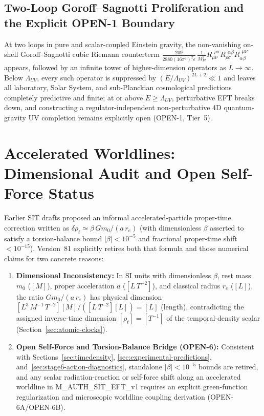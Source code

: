 \documentclass[american,11pt,letterpaper]{article}
\def\mathrm#1{#1}%
\def\texttt#1{#1}%
\def\emph#1{#1}%
\begin{document}
\subsection{Two-Loop Goroff--Sagnotti Proliferation and the Explicit \texttt{OPEN-1} Boundary}

At two loops in pure and scalar-coupled Einstein gravity, the non-vanishing on-shell Goroff--Sagnotti cubic Riemann counterterm $\frac{209}{2880(16\pi^2)^2\epsilon}\,\frac{1}{M_{\mathrm{Pl}}^2}R_{\mu\nu}^{\ \ \rho\sigma}R_{\rho\sigma}^{\ \ \alpha\beta}R_{\alpha\beta}^{\ \ \mu\nu}$ appears, followed by an infinite tower of higher-dimension operators as $L \to \infty$. Below $\Lambda_{\mathrm{UV}}$, every such operator is suppressed by $(E/\Lambda_{\mathrm{UV}})^{2L+2} \ll 1$ and leaves all laboratory, Solar System, and sub-Planckian cosmological predictions completely predictive and finite; at or above $E \ge \Lambda_{\mathrm{UV}}$, perturbative EFT breaks down, and constructing a regulator-independent non-perturbative 4D quantum-gravity UV completion remains explicitly open (\texttt{OPEN-1}, Tier~5).

\section{Accelerated Worldlines: Dimensional Audit and Open Self-Force Status}
\label{sec:electron-accel}

Earlier SIT drafts proposed an informal accelerated-particle proper-time correction written as $\delta\rho_t \simeq \beta\,G m_0 / (a\,r_e)$ (with dimensionless $\beta$ asserted to satisfy a torsion-balance bound $|\beta| < 10^{-5}$ and fractional proper-time shift $< 10^{-15}$). Version~81 explicitly \emph{retires} both that formula and those numerical claims for two concrete reasons:
\begin{enumerate}[leftmargin=2em]
  \item \textbf{Dimensional Inconsistency:} In SI units with dimensionless $\beta$, rest mass $m_0$ ($[\mathrm{M}]$), proper acceleration $a$ ($[\mathrm{L\,T^{-2}}]$), and classical radius $r_e$ ($[\mathrm{L}]$), the ratio $G m_0 / (a\,r_e)$ has physical dimension $[\mathrm{L^3\,M^{-1}\,T^{-2}}][\mathrm{M}] / ([\mathrm{L\,T^{-2}}][\mathrm{L}]) = [\mathrm{L}]$ (\emph{length}), contradicting the assigned inverse-time dimension $[\rho_t] = [\mathrm{T^{-1}}]$ of the temporal-density scalar (Section~\ref{sec:atomic-clocks}).
  \item \textbf{Open Self-Force and Torsion-Balance Bridge (\texttt{OPEN-6}):} Consistent with Sections~\ref{sec:timedensity}, \ref{sec:experimental-predictions}, and~\ref{sec:stage6-action-diagnostics}, standalone $|\beta| < 10^{-5}$ bounds are retired, and any scalar radiation-reaction or self-force shift along an accelerated worldline in \texttt{M\_AUTH\_SIT\_EFT\_v1} requires an explicit green-function regularization and microscopic worldline coupling derivation (\texttt{OPEN-6A}/\texttt{OPEN-6B}).
\end{enumerate}
\end{document}
